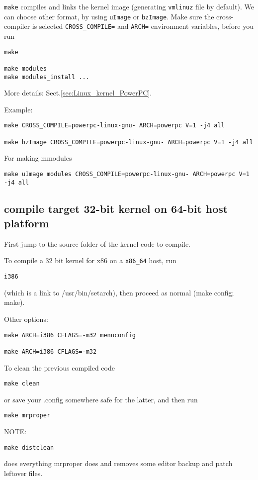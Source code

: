 \verb!make! compiles and links the kernel image (generating \verb!vmlinuz! file
by default). We can choose other format, by using \verb!uImage! or
\verb!bzImage!.
Make sure the cross-compiler is selected \verb!CROSS_COMPILE=! and \verb!ARCH=!
environment variables, before you run
\begin{verbatim}
make

make modules
make modules_install ...
\end{verbatim}
More details: Sect.\ref{sec:Linux_kernel_PowerPC}.

Example:
\begin{verbatim}
make CROSS_COMPILE=powerpc-linux-gnu- ARCH=powerpc V=1 -j4 all

make bzImage CROSS_COMPILE=powerpc-linux-gnu- ARCH=powerpc V=1 -j4 all
\end{verbatim}

For making mmodules
\begin{verbatim}
make uImage modules CROSS_COMPILE=powerpc-linux-gnu- ARCH=powerpc V=1 -j4 all
\end{verbatim}


\subsection{compile target 32-bit kernel on 64-bit host platform}
\label{sec:compile_32-bit-kernel_from-64-bit-platform}

First jump to the source folder of the kernel code to compile.

To compile a 32 bit kernel for x86 on a \verb!x86_64! host, run 
\begin{verbatim}
i386 
\end{verbatim}
(which is a link to /usr/bin/setarch), then proceed as normal (make config;
make).

Other options:
\begin{verbatim}
make ARCH=i386 CFLAGS=-m32 menuconfig

make ARCH=i386 CFLAGS=-m32
\end{verbatim}

To clean the previous compiled code
\begin{verbatim}
make clean
\end{verbatim}
or save your .config somewhere safe for the latter, and then run
\begin{verbatim}
make mrproper
\end{verbatim}

NOTE: 
\begin{verbatim}
make distclean
\end{verbatim}
does everything mrproper does and removes some editor backup and patch leftover
files.

